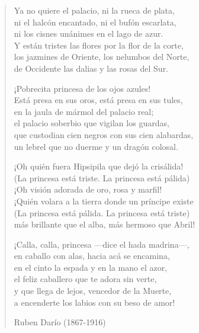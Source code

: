 \documentclass[12pt, twoside]{book}
\begin{document}
\begin{verse}
Ya no quiere el palacio, ni la rueca de plata,\\
ni el halcón encantado, ni el bufón escarlata,\\
ni los cisnes unánimes en el lago de azur.\\
Y están tristes las flores por la flor de la corte,\\
los jazmines de Oriente, los nelumbos del Norte,\\
de Occidente las dalias y las rosas del Sur.\newline

¡Pobrecita princesa de los ojos azules!\\
Está presa en sus oros, está presa en sus tules,\\
en la jaula de mármol del palacio real;\\
el palacio soberbio que vigilan los guardas,\\
que custodian cien negros con sus cien alabardas,\\
un lebrel que no duerme y un dragón colosal.\newline

¡Oh quién fuera Hipsipila que dejó la crisálida!\\
(La princesa está triste. La princesa está pálida)\\
¡Oh visión adorada de oro, rosa y marfil!\\
¡Quién volara a la tierra donde un príncipe existe\\
(La princesa está pálida. La princesa está triste)\\
más brillante que el alba, más hermoso que Abril!\newline

¡Calla, calla, princesa —dice el hada madrina—,\\
en caballo con alas, hacia acá se encamina,\\
en el cinto la espada y en la mano el azor,\\
el feliz caballero que te adora sin verte,\\
y que llega de lejos, vencedor de la Muerte,\\
a encenderte los labios con su beso de amor!\newline

Ruben Darío (1867-1916)

\end{verse}
\newpage
\end{document}
